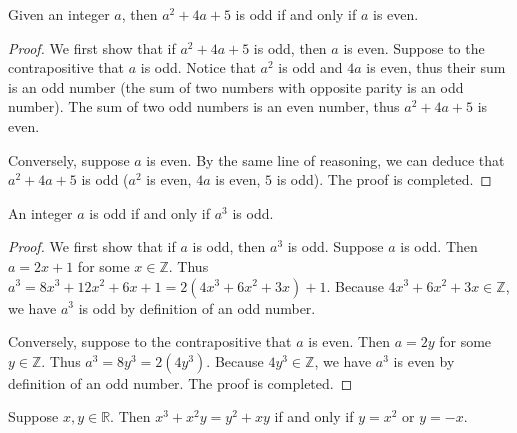 \documentclass{exam}
\begin{document}
\begin{proposition}{7.4}
    Given an integer $a$, then $a^2 + 4a + 5$ is odd if and only if $a$ is even.
\end{proposition}

\begin{proof}
    We first show that if $a^2 + 4a + 5$ is odd, then $a$ is even. Suppose to the contrapositive that $a$ is odd. Notice that $a^2$ is odd and $4a$ is even, thus their sum is an odd number (the sum of two numbers with opposite parity is an odd number). The sum of two odd numbers is an even number, thus $a^2 + 4a + 5$ is even.

    Conversely, suppose $a$ is even. By the same line of reasoning, we can deduce that $a^2 + 4a + 5$ is odd ($a^2$ is even, $4a$ is even, $5$ is odd). The proof is completed.
\end{proof}

\begin{proposition}{7.5}
    An integer $a$ is odd if and only if $a^3$ is odd.
\end{proposition}

\begin{proof}
    We first show that if $a$ is odd, then $a^3$ is odd. Suppose $a$ is odd. Then $a = 2x + 1$ for some $x\in\mathbb Z$. Thus $a^3 =8x^3 + 12x^2 + 6x + 1 = 2(4x^3+6x^2+3x) + 1$. Because $4x^3 + 6x^2 + 3x\in\mathbb Z$, we have $a^3$ is odd by definition of an odd number.

    Conversely, suppose to the contrapositive that $a$ is even. Then $a = 2y$ for some $y\in\mathbb Z$. Thus $a^3 = 8y^3 = 2(4y^3)$. Because $4y^3 \in\mathbb Z$, we have $a^3$ is even by definition of an odd number. The proof is completed.
\end{proof}

\begin{proposition}{7.6}
    Suppose $x, y\in\mathbb R$. Then $x^3 + x^2y=y^2 + xy$ if and only if $y=x^2$ or $y=-x$.
\end{proposition}
\end{document}
